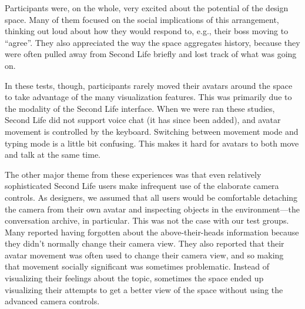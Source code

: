 Participants were, on the whole, very excited about the potential of the design space. Many of them focused on the social implications of this arrangement, thinking out loud about how they would respond to, e.g., their boss moving to ``agree''. They also appreciated the way the space aggregates history, because they were often pulled away from Second Life briefly and lost track of what was going on.

In these tests, though, participants rarely moved their avatars around the space to take advantage of the many visualization features. This was primarily due to the modality of the Second Life interface. When we were ran these studies, Second Life did not support voice chat (it has since been added), and avatar movement is controlled by the keyboard. Switching between movement mode and typing mode is a little bit confusing. This makes it hard for avatars to both move and talk at the same time.


The other major theme from these experiences was that even relatively sophisticated Second Life users make infrequent use of the elaborate camera controls. As designers, we assumed that all users would be comfortable detaching the camera from their own avatar and inspecting objects in the environment—the conversation archive, in particular. This was not the case with our test groups. Many reported having forgotten about the above-their-heads information because they didn't normally change their camera view. They also reported that their avatar movement was often used to change their camera view, and so making that movement socially significant was sometimes problematic. Instead of visualizing their feelings about the topic, sometimes the space ended up visualizing their attempts to get a better view of the space without using the advanced camera controls.

